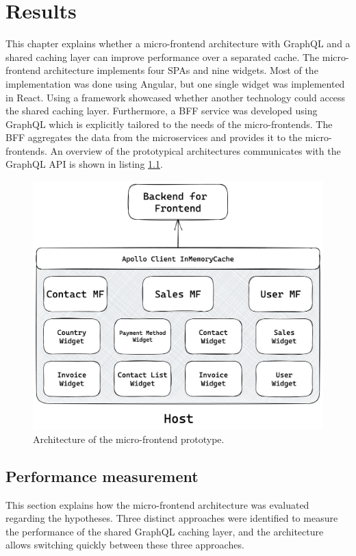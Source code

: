 \chapter{Results}\label{chapter:results}

This chapter explains whether a micro-frontend architecture with GraphQL and a shared caching layer can improve performance over a separated cache. The micro-frontend architecture implements four \acp{SPA} and nine widgets. Most of the implementation was done using Angular, but one single widget was implemented in React. Using a framework showcased whether another technology could access the shared caching layer. Furthermore, a \ac{BFF} service was developed using GraphQL which is explicitly tailored to the needs of the micro-frontends. The \ac{BFF} aggregates the data from the microservices and provides it to the micro-frontends. An overview of the prototypical architectures communicates with the GraphQL \ac{API} is shown in listing \ref{fig:results:micro-frontend-prototype}.

\ifshowImages
\begin{figure}[H]
  \centering
  \includegraphics[width=0.8\linewidth]{images/results/micro-frontend-prototype.png}
  \caption{Architecture of the micro-frontend prototype.}\label{fig:results:micro-frontend-prototype}
\end{figure}
\fi

\section{Performance measurement}\label{section:results:performance-measurement}

This section explains how the micro-frontend architecture was evaluated regarding the hypotheses. Three distinct approaches were identified to measure the performance of the shared GraphQL caching layer, and the architecture allows switching quickly between these three approaches.

